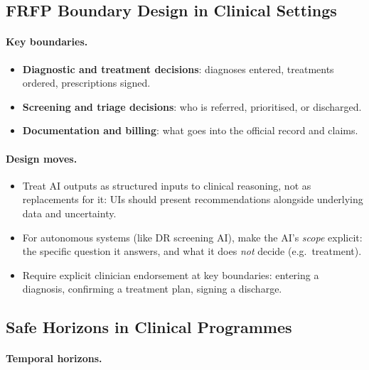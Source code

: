 \subsection{FRFP Boundary Design in Clinical Settings}

\paragraph{Key boundaries.}

\begin{itemize}
  \item \textbf{Diagnostic and treatment decisions}:
        diagnoses entered, treatments ordered, prescriptions signed.
  \item \textbf{Screening and triage decisions}:
        who is referred, prioritised, or discharged.
  \item \textbf{Documentation and billing}:
        what goes into the official record and claims.
\end{itemize}

\paragraph{Design moves.}

\begin{itemize}
  \item Treat AI outputs as structured inputs to clinical reasoning,
        not as replacements for it:
        UIs should present recommendations alongside underlying data
        and uncertainty.
  \item For autonomous systems (like DR screening AI), make the AI’s
        \emph{scope} explicit:
        the specific question it answers, and what it does \emph{not}
        decide (e.g.\ treatment).
  \item Require explicit clinician endorsement at key boundaries:
        entering a diagnosis, confirming a treatment plan, signing a
        discharge.
\end{itemize}

\subsection{Safe Horizons in Clinical Programmes}

\paragraph{Temporal horizons.}

